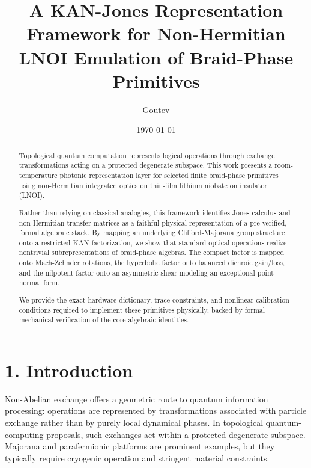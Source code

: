 \documentclass[aps,prl,twocolumn,superscriptaddress,amsmath,amssymb]{revtex4-2}
\begin{document}

\title{A KAN-Jones Representation Framework for Non-Hermitian LNOI Emulation of Braid-Phase Primitives}

\author{Goutev}

\date{\today}

\begin{abstract}
Topological quantum computation represents logical operations through exchange transformations acting on a protected degenerate subspace. This work presents a room-temperature photonic representation layer for selected finite braid-phase primitives using non-Hermitian integrated optics on thin-film lithium niobate on insulator (LNOI).

Rather than relying on classical analogies, this framework identifies Jones calculus and non-Hermitian transfer matrices as a faithful physical representation of a pre-verified, formal algebraic stack. By mapping an underlying Clifford-Majorana group structure onto a restricted KAN factorization, we show that standard optical operations realize nontrivial subrepresentations of braid-phase algebras. The compact factor is mapped onto Mach-Zehnder rotations, the hyperbolic factor onto balanced dichroic gain/loss, and the nilpotent factor onto an asymmetric shear modeling an exceptional-point normal form.

We provide the exact hardware dictionary, trace constraints, and nonlinear calibration conditions required to implement these primitives physically, backed by formal mechanical verification of the core algebraic identities.
\end{abstract}

\maketitle

\section{1. Introduction}

Non-Abelian exchange offers a geometric route to quantum information processing: operations are represented by transformations associated with particle exchange rather than by purely local dynamical phases. In topological quantum-computing proposals, such exchanges act within a protected degenerate subspace. Majorana and parafermionic platforms are prominent examples, but they typically require cryogenic operation and stringent material constraints.
\end{document}
